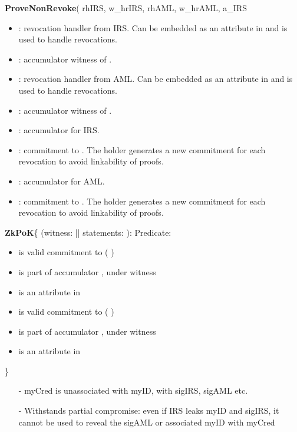 \vspace{.5em}\textbf{ProveNonRevoke}( rhIRS, w\_hrIRS, rhAML, w\_hrAML, a\_IRS
\begin{itemize}
    \item {}: revocation handler from IRS. Can be embedded as an attribute in  and is used to handle revocations.
    \item {}: accumulator witness of .
    \item {}: revocation handler from AML. Can be embedded as an attribute in  and is used to handle revocations.
    \item {}: accumulator witness of .
    \item {}: accumulator for IRS.
    \item {}: commitment to . The holder generates a new commitment for each revocation to avoid linkability of proofs. 
    \item {}: accumulator for AML.
    \item {}: commitment to . The holder generates a new commitment for each revocation to avoid linkability of proofs. 
\end{itemize}


\vspace{.5em}
\textbf{ZkPoK}\{ (witness: || statements:  ):
Predicate:
	\begin{itemize}[label={- }]
	\item {} is valid commitment to (  )
	\item {} is part of accumulator , under witness 
	\item {} is an attribute in 
	\item {} is valid commitment to (  )
	\item {} is part of accumulator , under witness 
	\item {} is an attribute in 
	\end{itemize}
\}

	\begin{itemize}
		\item[- ] myCred is unassociated with myID, with sigIRS, sigAML etc.
    \item[- ] Withstands partial compromise: even if IRS leaks myID and sigIRS, it cannot be used to reveal the sigAML or associated myID with myCred
	\end{itemize}
